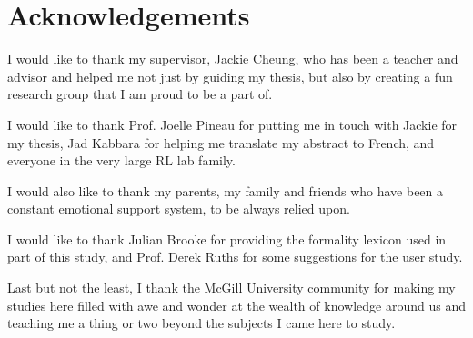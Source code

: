 \chapter*{Acknowledgements}

I would like to thank my supervisor, Jackie Cheung, who has been a teacher and advisor and helped me not just by guiding my thesis, but also by creating a fun research group that I am proud to be a part of.

I would like to thank Prof. Joelle Pineau for putting me in touch with Jackie for my thesis, Jad Kabbara for helping me translate my abstract to French, and everyone in the very large RL lab family.

I would also like to thank my parents, my family and friends who have been a constant emotional support system, to be always relied upon.

I would like to thank Julian Brooke for providing the formality lexicon used in part of this study, and Prof. Derek Ruths for some suggestions for the user study.

Last but not the least, I thank the McGill University community for making my studies here filled with awe and wonder at the wealth of knowledge around us and teaching me a thing or two beyond the subjects I came here to study.  